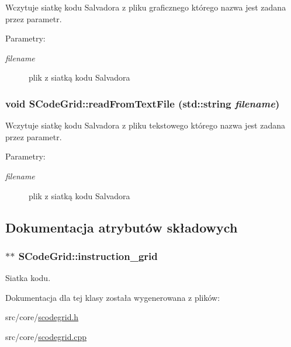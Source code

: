 Wczytuje siatkę kodu Salvadora z pliku graficznego którego nazwa jest zadana przez parametr. \begin{Desc}
\item[Parametry:]
\begin{description}
\item[{\em filename}]plik z siatką kodu Salvadora \end{description}
\end{Desc}
\hypertarget{classSCodeGrid_9daa13298d0f41c18629f3fbad8b2a85}{
\subsubsection[{readFromTextFile}]{\setlength{\rightskip}{0pt plus 5cm}void SCodeGrid::readFromTextFile (std::string {\em filename})}}
\label{classSCodeGrid_9daa13298d0f41c18629f3fbad8b2a85}


Wczytuje siatkę kodu Salvadora z pliku tekstowego którego nazwa jest zadana przez parametr. \begin{Desc}
\item[Parametry:]
\begin{description}
\item[{\em filename}]plik z siatką kodu Salvadora \end{description}
\end{Desc}


\subsection{Dokumentacja atrybutów składowych}
\hypertarget{classSCodeGrid_445b4bd8cca6ddb7100afa621f5722b0}{
\subsubsection[{instruction\_\-grid}]{$\ast$$\ast$ {\bf SCodeGrid::instruction\_\-grid}}}
\label{classSCodeGrid_445b4bd8cca6ddb7100afa621f5722b0}


Siatka kodu. 

Dokumentacja dla tej klasy została wygenerowana z plików:\begin{CompactItemize}
\item 
src/core/\hyperlink{scodegrid_8h}{scodegrid.h}\item 
src/core/\hyperlink{scodegrid_8cpp}{scodegrid.cpp}\end{CompactItemize}

